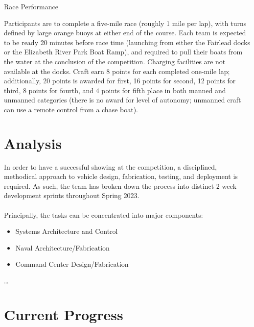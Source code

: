 \documentclass{article}
\begin{document}
\begin{description}
    \item[Race Performance]
\end{description}
Participants are to complete a five-mile race (roughly 1 mile per lap), with turns defined by large orange buoys at either end of the course. Each team is expected to be ready 20 minutes before race time (launching from either the Fairlead docks or the Elizabeth River Park Boat Ramp), and required to pull their boats from the water at the conclusion of the competition. Charging facilities are not available at the docks. Craft earn 8 points for each completed one-mile lap; additionally, 20 points is awarded for first, 16 points for second, 12 points for third, 8 points for fourth, and 4 points for fifth place in both manned and unmanned categories (there is no award for level of autonomy; unmanned craft can use a remote control from a chase boat).  

\section{Analysis}

In order to have a successful showing at the competition, a disciplined, methodical approach to vehicle design, fabrication, testing, and deployment is required. As such, the team has broken down the process into distinct 2 week development sprints throughout Spring 2023. \\ \\ Principally, the tasks can be concentrated into major components:
\begin{itemize}
\item Systems Architecture and Control 
\item Naval Architecture/Fabrication
\item Command Center Design/Fabrication 
\end{itemize}
  \ldots
\pagebreak
\section{Current Progress}
\end{document}
